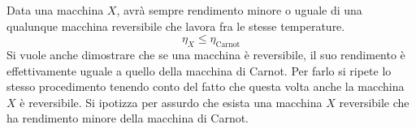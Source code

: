 \documentclass[10pt,a4paper]{book}
\begin{document}
\begin{figure}[htpb]
\end{figure}
\FloatBarrier
Data una macchina $X$, avrà sempre rendimento minore o uguale di una qualunque macchina reversibile che lavora fra le stesse temperature.
\[
	\boxed{\eta_X \le \eta_{\text{Carnot} }}
\]
Si vuole anche dimostrare che se una macchina è reversibile, il suo rendimento è effettivamente uguale a quello della macchina di Carnot. Per farlo si ripete lo stesso procedimento tenendo conto del fatto che questa volta anche la macchina $X$ è reversibile. Si ipotizza per assurdo che esista una macchina $X$ reversibile che ha rendimento minore della macchina di Carnot.
\end{document}
